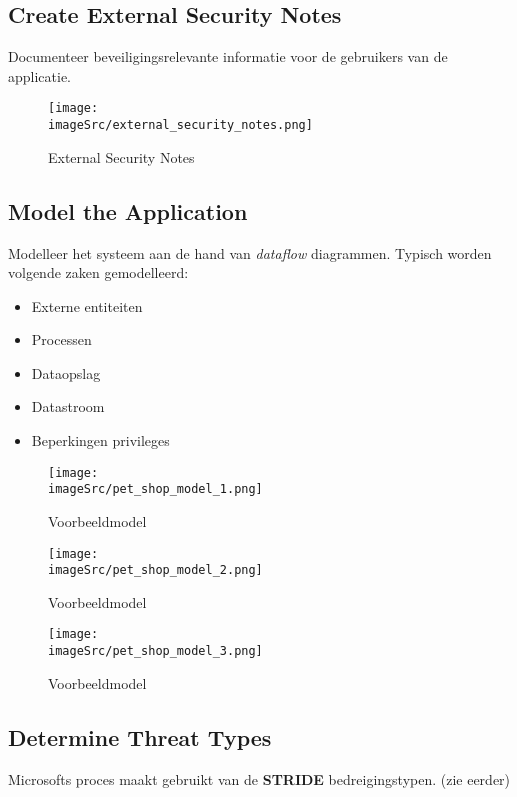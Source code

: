 \documentclass[../main.tex]{subfiles}
\begin{document}
\subsection{Create External Security Notes}
Documenteer beveiligingsrelevante informatie voor de gebruikers van de applicatie.
\begin{figure}[h1]
    \centering
    \texttt{[image: \\imageSrc/external\_security\_notes.png]}
    \caption{External Security Notes}
    \label{fig:external_security_notes}
\end{figure}

\subsection{Model the Application}
Modelleer het systeem aan de hand van \textit{dataflow} diagrammen. Typisch worden volgende zaken gemodelleerd:
\begin{multicols}{2}
\begin{itemize}
	\item Externe entiteiten
	\item Processen
	\item Dataopslag
	\item Datastroom
	\item Beperkingen privileges
\end{itemize}
\end{multicols}

\begin{figure}[h!]
    \centering
    \texttt{[image: \\imageSrc/pet\_shop\_model\_1.png]}
    \caption{Voorbeeldmodel}
    \label{example1}
\end{figure}

\begin{figure}[h!]
    \centering
    \texttt{[image: \\imageSrc/pet\_shop\_model\_2.png]}
    \caption{Voorbeeldmodel}
    \label{example2}
\end{figure}

\begin{figure}[h!]
    \centering
    \texttt{[image: \\imageSrc/pet\_shop\_model\_3.png]}
    \caption{Voorbeeldmodel}
    \label{example3}
\end{figure}

\subsection{Determine Threat Types}
Microsofts proces maakt gebruikt van de  \textbf{STRIDE} bedreigingstypen. (zie eerder) 
\end{document}
